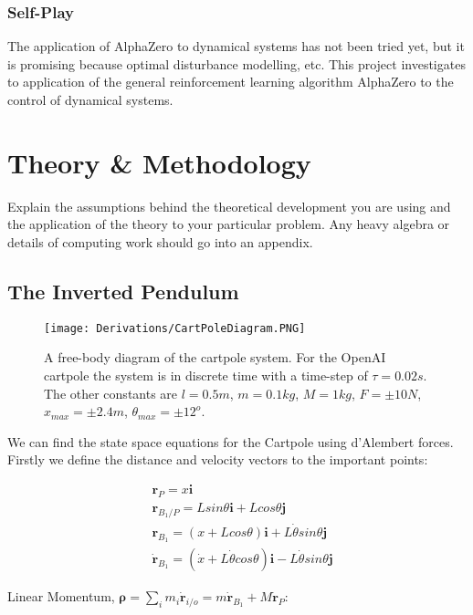 \documentclass[12pt]{report}
\begin{document}
\subsection{Self-Play}

The application of AlphaZero to dynamical systems has not been tried yet, but it is promising because optimal disturbance modelling, etc. This project investigates to application of the general reinforcement learning algorithm AlphaZero to the control of dynamical systems.

\chapter{Theory \& Methodology}
Explain the assumptions behind the theoretical development you are using and the application of the theory to your particular problem. Any heavy algebra or details of computing work should go into an appendix.

\section{The Inverted Pendulum}

\begin{figure}[h]
    \centering
    \texttt{[image: Derivations/CartPoleDiagram.PNG]}
    \caption{A free-body diagram of the cartpole system. For the OpenAI cartpole the system is in discrete time with a time-step of $\tau = 0.02s$. The other constants are $l = 0.5m$, $m=0.1kg$, $M=1kg$, $F=\pm10N$, $x_{max}=\pm 2.4m$, $\theta_{max} = \pm 12^o$.}
    \label{fig:my_label}
\end{figure}

We can find the state space equations for the Cartpole using d'Alembert forces. Firstly we define the distance and velocity vectors to the important points:

\begin{align*}
    & \boldsymbol{r}_P = x \boldsymbol{i} \\
    & \boldsymbol{r}_{B_1/P} = Lsin \theta \boldsymbol{i} + Lcos \theta \boldsymbol{j} \\
    & \boldsymbol{r}_{B_1} = (x+Lcos \theta)\boldsymbol{i}+L \dot{\theta} sin \theta  \boldsymbol{j} \\
    & \dot{\boldsymbol{r}}_{B_1} = (\dot{x} + L\dot{\theta}cos\theta)\boldsymbol{i} - L\dot{\theta}sin\theta \boldsymbol{j}
\end{align*}

Linear Momentum, $\boldsymbol{\rho} = \sum_i m_i \dot{\boldsymbol{r}}_{i/o} = m \dot{\boldsymbol{r}}_{B_1} + M \dot{\boldsymbol{r}}_{P}$:
\end{document}
